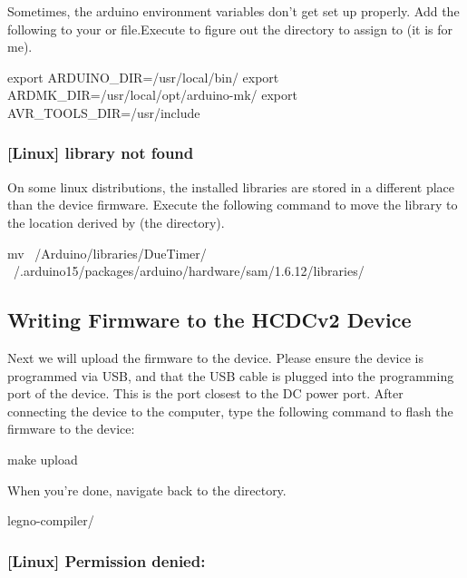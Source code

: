 Sometimes, the arduino environment variables don't get set up properly. Add the following to your  or  file.Execute  to figure out the directory to assign  to (it is  for me).

\begin{snippet}
export ARDUINO_DIR=/usr/local/bin/
export ARDMK_DIR=/usr/local/opt/arduino-mk/
export AVR_TOOLS_DIR=/usr/include
\end{snippet}

\subsubsection{[Linux]  library not found}

On some linux distributions, the installed libraries are stored in a different
place than the device firmware. Execute the following command to move the
 library to the location derived by  (the
 directory).

\begin{snippet}
  mv ~/Arduino/libraries/DueTimer/ ~/.arduino15/packages/arduino/hardware/sam/1.6.12/libraries/
\end{snippet}

\subsection{Writing Firmware to the HCDCv2 Device}
Next we will upload the firmware to the
device. Please ensure the device is programmed via USB,
and that the USB cable is plugged into the programming port of the device.
This is the port closest to the DC power port. After connecting the device to the computer, type the following command to flash the firmware to the device:

\begin{snippet}
  make upload
\end{snippet}

When you're done, navigate back to the  directory.

\begin{snippet}
  legno-compiler/
\end{snippet}


\subsubsection{[Linux] Permission denied: }

